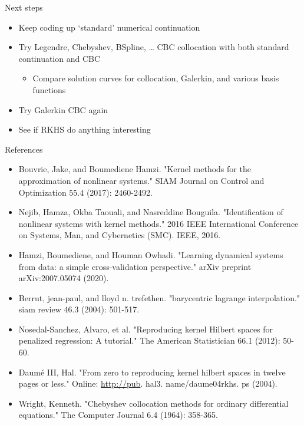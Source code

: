 \documentclass[presentation]{beamer}
\begin{document}
\begin{frame}[label={sec:orgbf5204e}]{Next steps}
\begin{itemize}
\item Keep coding up `standard' numerical continuation
\end{itemize}
\vfill
\begin{itemize}
\item Try Legendre, Chebyshev, BSpline, \dots{} CBC collocation with both standard continuation and CBC
\begin{itemize}
\item Compare solution curves for collocation, Galerkin, and various basis functions
\end{itemize}
\end{itemize}
\vfill
\begin{itemize}
\item Try Galerkin CBC again
\end{itemize}
\vfill
\begin{itemize}
\item See if RKHS do anything interesting
\end{itemize}
\end{frame}

\begin{frame}[label={sec:org893ffb5},plain]{References}
\begin{itemize}
\item Bouvrie, Jake, and Boumediene Hamzi. "Kernel methods for the approximation of nonlinear systems." SIAM Journal on Control and Optimization 55.4 (2017): 2460-2492.
\item Nejib, Hamza, Okba Taouali, and Nasreddine Bouguila. "Identification of nonlinear systems with kernel methods." 2016 IEEE International Conference on Systems, Man, and Cybernetics (SMC). IEEE, 2016.
\item Hamzi, Boumediene, and Houman Owhadi. "Learning dynamical systems from data: a simple cross-validation perspective." arXiv preprint arXiv:2007.05074 (2020).
\item Berrut, jean-paul, and lloyd n. trefethen. "barycentric lagrange interpolation." siam review 46.3 (2004): 501-517.
\item Nosedal-Sanchez, Alvaro, et al. "Reproducing kernel Hilbert spaces for penalized regression: A tutorial." The American Statistician 66.1 (2012): 50-60.
\item Daumé III, Hal. "From zero to reproducing kernel hilbert spaces in twelve pages or less." Online: \url{http://pub}. hal3. name/daume04rkhs. ps (2004).
\item Wright, Kenneth. "Chebyshev collocation methods for ordinary differential equations." The Computer Journal 6.4 (1964): 358-365.
\end{itemize}
\end{frame}
\end{document}
